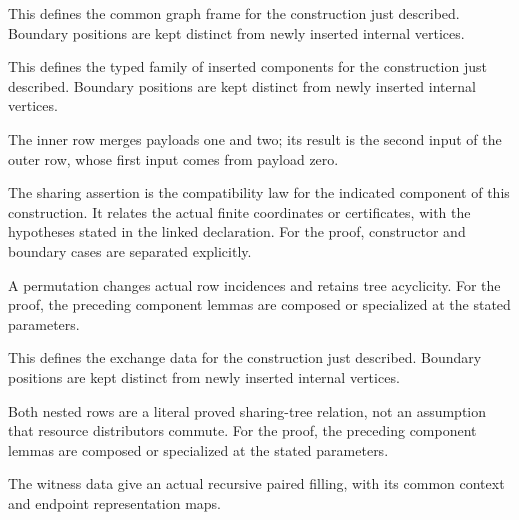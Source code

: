 This defines the common graph frame for the construction just described. Boundary positions are kept distinct from newly inserted internal vertices.
\par{}

This defines the typed family of inserted components for the construction just described. Boundary positions are kept distinct from newly inserted internal vertices.
\par{}

The inner row merges payloads one and two; its result is the second input of the outer row, whose first input comes from payload zero.
\par{}

The sharing assertion is the compatibility law for the indicated component of this construction. It relates the actual finite coordinates or certificates, with the hypotheses stated in the linked declaration.
For the proof, constructor and boundary cases are separated explicitly.
\par{}

A permutation changes actual row incidences and retains tree acyclicity.
For the proof, the preceding component lemmas are composed or specialized at the stated parameters.
\par{}

This defines the exchange data for the construction just described. Boundary positions are kept distinct from newly inserted internal vertices.
\par{}

Both nested rows are a literal proved sharing-tree relation, not an assumption that resource distributors commute.
For the proof, the preceding component lemmas are composed or specialized at the stated parameters.
\par{}

The witness data give an actual recursive paired filling, with its common context and endpoint representation maps.
\par{}

